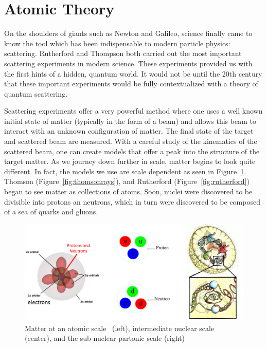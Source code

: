 \clearpage
\section{Atomic Theory}

On the shoulders of giants such as Newton and Galileo, science finally came to
know the tool which has been indispensable to modern particle physics:
scattering. Rutherford and Thompson both carried out the most important
scattering experiments in modern science. These experiments provided us with
the first hints of a hidden, quantum world. It would not be until the 20th
century that these important experiments would be fully contextualized with a
theory of quantum scattering.

Scattering experiments offer a very powerful method where one uses a well known
initial state of matter (typically in the form of a beam) and allows this beam
to interact with an unknown configuration of matter. The final state of the
target and scattered beam are measured. With a careful study of the kinematics
of the scattered beam, one can create models that offer a peak into the
structure of the target matter. As we journey down further in scale, matter
begins to look quite different.  In fact, the models we use are scale dependent
as seen in Figure~\ref{fig:scale_of_matter}. Thomson
(Figure~\ref{fig:thomsonrays}), and Rutherford (Figure~\ref{fig:rutherford})
began to see matter as collections of atoms.  Soon, nuclei were discovered to be
divisible into protons an neutrons, which in turn were discovered to be composed
of a sea of quarks and gluons.

\begin{figure}[ht]
	\centering
	\includegraphics[width=\linewidth]{./figures/scale_of_matter.png}
	\caption{
    Matter at an atomic scale~\cite{Freudenrich2001} (left), intermediate
    nuclear scale~\cite{Manisearth2010} (center), and the sub-nuclear partonic
    scale (right)~\cite{Morreale2009}
	}
	\label{fig:scale_of_matter}
\end{figure}

